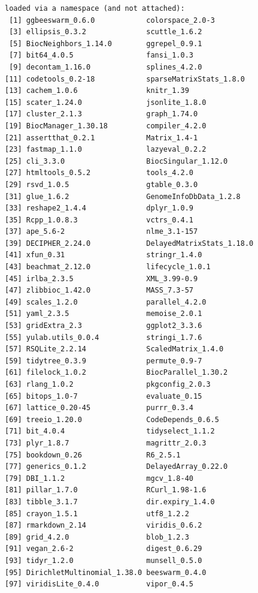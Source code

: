 \documentclass[
]{book}
\begin{document}
\begin{verbatim}
loaded via a namespace (and not attached):
 [1] ggbeeswarm_0.6.0            colorspace_2.0-3           
 [3] ellipsis_0.3.2              scuttle_1.6.2              
 [5] BiocNeighbors_1.14.0        ggrepel_0.9.1              
 [7] bit64_4.0.5                 fansi_1.0.3                
 [9] decontam_1.16.0             splines_4.2.0              
[11] codetools_0.2-18            sparseMatrixStats_1.8.0    
[13] cachem_1.0.6                knitr_1.39                 
[15] scater_1.24.0               jsonlite_1.8.0             
[17] cluster_2.1.3               graph_1.74.0               
[19] BiocManager_1.30.18         compiler_4.2.0             
[21] assertthat_0.2.1            Matrix_1.4-1               
[23] fastmap_1.1.0               lazyeval_0.2.2             
[25] cli_3.3.0                   BiocSingular_1.12.0        
[27] htmltools_0.5.2             tools_4.2.0                
[29] rsvd_1.0.5                  gtable_0.3.0               
[31] glue_1.6.2                  GenomeInfoDbData_1.2.8     
[33] reshape2_1.4.4              dplyr_1.0.9                
[35] Rcpp_1.0.8.3                vctrs_0.4.1                
[37] ape_5.6-2                   nlme_3.1-157               
[39] DECIPHER_2.24.0             DelayedMatrixStats_1.18.0  
[41] xfun_0.31                   stringr_1.4.0              
[43] beachmat_2.12.0             lifecycle_1.0.1            
[45] irlba_2.3.5                 XML_3.99-0.9               
[47] zlibbioc_1.42.0             MASS_7.3-57                
[49] scales_1.2.0                parallel_4.2.0             
[51] yaml_2.3.5                  memoise_2.0.1              
[53] gridExtra_2.3               ggplot2_3.3.6              
[55] yulab.utils_0.0.4           stringi_1.7.6              
[57] RSQLite_2.2.14              ScaledMatrix_1.4.0         
[59] tidytree_0.3.9              permute_0.9-7              
[61] filelock_1.0.2              BiocParallel_1.30.2        
[63] rlang_1.0.2                 pkgconfig_2.0.3            
[65] bitops_1.0-7                evaluate_0.15              
[67] lattice_0.20-45             purrr_0.3.4                
[69] treeio_1.20.0               CodeDepends_0.6.5          
[71] bit_4.0.4                   tidyselect_1.1.2           
[73] plyr_1.8.7                  magrittr_2.0.3             
[75] bookdown_0.26               R6_2.5.1                   
[77] generics_0.1.2              DelayedArray_0.22.0        
[79] DBI_1.1.2                   mgcv_1.8-40                
[81] pillar_1.7.0                RCurl_1.98-1.6             
[83] tibble_3.1.7                dir.expiry_1.4.0           
[85] crayon_1.5.1                utf8_1.2.2                 
[87] rmarkdown_2.14              viridis_0.6.2              
[89] grid_4.2.0                  blob_1.2.3                 
[91] vegan_2.6-2                 digest_0.6.29              
[93] tidyr_1.2.0                 munsell_0.5.0              
[95] DirichletMultinomial_1.38.0 beeswarm_0.4.0             
[97] viridisLite_0.4.0           vipor_0.4.5                
\end{verbatim}
\end{document}
